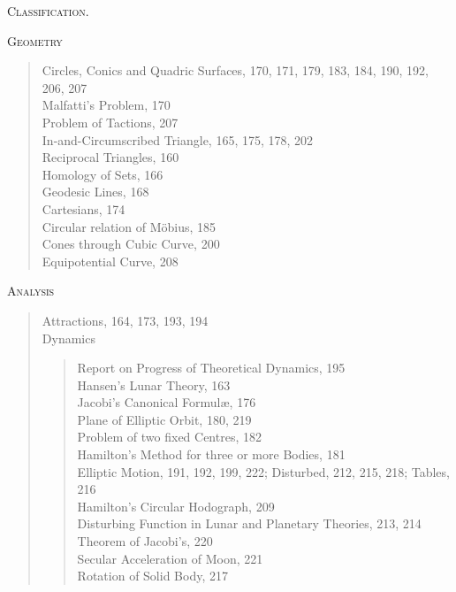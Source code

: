 \documentclass[11pt]{article}
\begin{document}
\newpage


\begin{center}
{\Large\scshape Classification.}
\end{center}

\bigskip

\noindent\textsc{Geometry}

\medskip

\begin{quote}
\noindent Circles, Conics and Quadric Surfaces, 170, 171, 179, 183, 184, 190, 192, 206, 207\\
Malfatti's Problem, 170\\
Problem of Tactions, 207\\
In-and-Circumscribed Triangle, 165, 175, 178, 202\\
Reciprocal Triangles, 160\\
Homology of Sets, 166\\
Geodesic Lines, 168\\
Cartesians, 174\\
Circular relation of M\"obius, 185\\
Cones through Cubic Curve, 200\\
Equipotential Curve, 208
\end{quote}

\bigskip

\noindent\textsc{Analysis}

\medskip

\begin{quote}
\noindent Attractions, 164, 173, 193, 194\\[2pt]
Dynamics
\begin{quote}
\noindent Report on Progress of Theoretical Dynamics, 195\\
Hansen's Lunar Theory, 163\\
Jacobi's Canonical Formul\ae, 176\\
Plane of Elliptic Orbit, 180, 219\\
Problem of two fixed Centres, 182\\
Hamilton's Method for three or more Bodies, 181\\
Elliptic Motion, 191, 192, 199, 222; Disturbed, 212, 215, 218; Tables, 216\\
Hamilton's Circular Hodograph, 209\\
Disturbing Function in Lunar and Planetary Theories, 213, 214\\
Theorem of Jacobi's, 220\\
Secular Acceleration of Moon, 221\\
Rotation of Solid Body, 217
\end{quote}
\end{quote}
\end{document}
